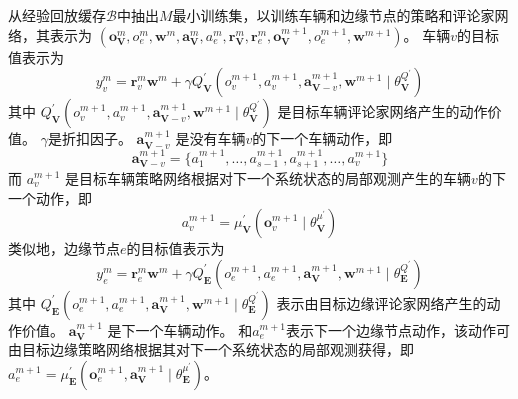 从经验回放缓存$\mathcal{B}$中抽出$M$最小训练集，以训练车辆和边缘节点的策略和评论家网络，其表示为 $\left(\boldsymbol{o}_{\mathbf{V}}^{m}, {o}_{e}^{m}, \boldsymbol{w}^{m}, \boldsymbol{a}_{\mathbf{V}}^{m}, {a}_{e}^{m}, \boldsymbol{r}_{\mathbf{V}}^{m}, \boldsymbol{r}_{e}^{m}, \boldsymbol{o}_{\mathbf{V}}^{m+1}, {o}_{e}^{m+1}, \boldsymbol{w}^{m+1}\right)$。
车辆$v$的目标值表示为
\begin{equation}
	y_{v}^{m} = \boldsymbol{r}_{v}^{m} \boldsymbol{w}^{m} +\gamma Q_{\mathbf{V}}^{\prime}\left({o}_{v}^{m+1},  {a}_{v}^{m+1}, \boldsymbol{a}_{\boldsymbol{\mathbf{V}}-v}^{m+1}, \boldsymbol{w}^{m+1} \mid \theta_{\mathbf{V}}^{Q^{\prime}} \right)
\end{equation}
\noindent 其中 $Q_{\mathbf{V}}^{\prime}({o}_{v}^{m+1},  {a}_{v}^{m+1}, \boldsymbol{a}_{\boldsymbol{\mathbf{V}}-v}^{m+1}, \boldsymbol{w}^{m+1} \mid \theta_{\mathbf{V}}^{Q^{\prime}})$ 是目标车辆评论家网络产生的动作价值。
$\gamma$是折扣因子。
$\boldsymbol{a}_{\boldsymbol{\mathbf{V}}-v}^{m+1}$ 是没有车辆$v$的下一个车辆动作，即
\begin{equation}
	\boldsymbol{a}_{\boldsymbol{\mathbf{V}}-v}^{m+1} = \{ {a}_{1}^{m+1}, \ldots, {a}_{s-1}^{m+1}, {a}_{s+1}^{m+1}, \ldots, {a}_{v}^{m+1} \}
\end{equation}
而 ${a}_{v}^{m+1}$ 是目标车辆策略网络根据对下一个系统状态的局部观测产生的车辆$v$的下一个动作，即
\begin{equation}
	{a}_{v}^{m+1} = \mu_{\mathbf{V}}^{\prime}(\boldsymbol{o}_{v}^{m+1} \mid \theta_{\mathbf{V}}^{\mu^{\prime}})
\end{equation}
类似地，边缘节点$e$的目标值表示为
\begin{equation}
	y_{e}^{m} = \boldsymbol{r}_{e}^{m} \boldsymbol{w}^{m} +\gamma Q_{\mathbf{E}}^{\prime}\left({o}_{e}^{m+1},  {a}_{e}^{m+1}, \boldsymbol{a}_{\boldsymbol{\mathbf{V}}}^{m+1}, \boldsymbol{w}^{m+1} \mid \theta_{\mathbf{E}}^{Q^{\prime}} \right)
\end{equation}
\noindent 其中 $Q_{\mathbf{E}}^{\prime}({o}_{e}^{m+1},  {a}_{e}^{m+1}, \boldsymbol{a}_{\boldsymbol{\mathbf{V}}}^{m+1}, \boldsymbol{w}^{m+1} \mid \theta_{\mathbf{E}}^{Q^{\prime}})$ 表示由目标边缘评论家网络产生的动作价值。 $\boldsymbol{a}_{\boldsymbol{\mathbf{V}}}^{m+1}$ 是下一个车辆动作。
和${a}_{e}^{m+1}$表示下一个边缘节点动作，该动作可由目标边缘策略网络根据其对下一个系统状态的局部观测获得，即${a}_{e}^{m+1} = \mu_{\mathbf{E}}^{\prime}(\boldsymbol{o}_{e}^{m+1}, \boldsymbol{a}_{\mathbf{V}}^{m+1} \mid \theta_{\mathbf{E}}^{\mu^{\prime}})$。

